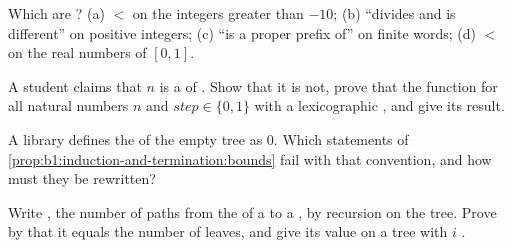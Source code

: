 \begin{exercise}[$\star$]\label{exo:b1:induction-and-termination:4}
Which  are ? (a) $<$ on the integers greater than $-10$; (b) ``divides and is different'' on
positive integers; (c) ``is a proper prefix of'' on finite words; (d) $<$ on the real numbers of $[0, 1]$.
\end{exercise}

\begin{exercise}[$\star\star$]\label{exo:b1:induction-and-termination:5}
A student claims that $n$ is a  of . Show that it is not, prove that the function  for
all natural numbers $n$ and $\mathit{step} \in \{0, 1\}$ with a lexicographic , and give its result.
\end{exercise}

\begin{exercise}[$\star\star$]\label{exo:b1:induction-and-termination:6}
A library defines the  of the empty tree as 0. Which statements of
\cref{prop:b1:induction-and-termination:bounds} fail with that convention, and how must they be rewritten?
\end{exercise}

\begin{exercise}[$\star\star$]\label{exo:b1:induction-and-termination:7}
Write , the number of paths from the  of a  to a , by recursion on the tree.
Prove by  that it equals the number of leaves, and give its value on a  tree with $i$ .
\end{exercise}

